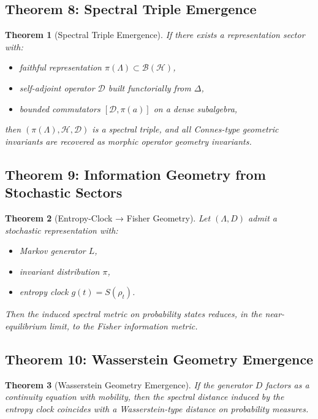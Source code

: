\documentclass[12pt, oneside]{article}
\newtheorem{theorem}{Theorem}[section]
\begin{document}
\subsection{Theorem 8: Spectral Triple Emergence}

\begin{theorem}[Spectral Triple Emergence]
If there exists a representation sector with:
\begin{itemize}
    \item faithful representation $\pi(\Lambda) \subset \mathcal{B}(\mathcal{H})$,
    \item self-adjoint operator $\mathcal{D}$ built functorially from $\Delta$,
    \item bounded commutators $[\mathcal{D}, \pi(a)]$ on a dense subalgebra,
\end{itemize}
then $(\pi(\Lambda), \mathcal{H}, \mathcal{D})$ is a spectral triple, and all Connes-type geometric invariants are recovered as morphic operator geometry invariants.
\end{theorem}

\subsection{Theorem 9: Information Geometry from Stochastic Sectors}

\begin{theorem}[Entropy-Clock → Fisher Geometry]
Let $(\Lambda, D)$ admit a stochastic representation with:
\begin{itemize}
    \item Markov generator $L$,
    \item invariant distribution $\pi$,
    \item entropy clock $g(t) = S(\rho_t)$.
\end{itemize}
Then the induced spectral metric on probability states reduces, in the near-equilibrium limit, to the Fisher information metric.
\end{theorem}

\subsection{Theorem 10: Wasserstein Geometry Emergence}

\begin{theorem}[Wasserstein Geometry Emergence]
If the generator $D$ factors as a continuity equation with mobility, then the spectral distance induced by the entropy clock coincides with a Wasserstein-type distance on probability measures.
\end{theorem}
\end{document}
